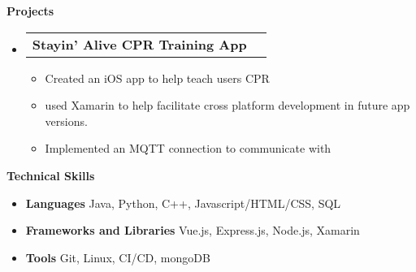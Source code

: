 \documentclass[letterpaper,12pt]{article}[leftmargin=*]
\makeatletter
\def \entryspacing {-0pt}
\renewcommand{\section}[2]{\vspace{5pt}
  \colorbox{secondary}{\color{white}\raggedbottom\normalsize\textbf{{#1}{\hspace{7pt}#2}}}
}
\newcommand{\resumeEntryStart}{\begin{itemize}[leftmargin=2.5mm]}
\newcommand{\resumeEntryEnd}{\end{itemize}\vspace{\entryspacing}}
\newcommand{\resumeItemListStart}{\begin{itemize}[leftmargin=4.5mm]}
\newcommand{\resumeItemListEnd}{\end{itemize}}
\newcommand{\resumeItem}[1]{
  \item\small{
    {#1 \vspace{-2pt}}
  }
}
\newcommand{\resumeEntryTD}[2]{
  \vspace{-1pt}\item[]
    \begin{tabularx}{0.97\textwidth}{X@{\hspace{60pt}}r}
      \textbf{\color{primary}#1} & {\firabook\color{accent}\small#2} \\
    \end{tabularx}\vspace{-6pt}
}
\newcommand{\resumeEntryS}[2]{
  \item[]\small{
    \textbf{\color{primary}#1 }{ #2 \vspace{-6pt}}
  }
}
\makeatother
\begin{document}
\section{\faFlask}{Projects}

  \resumeEntryStart
    \resumeEntryTD
      {Stayin' Alive CPR Training App}{}
    \resumeItemListStart
      \resumeItem {Created an iOS app to help teach users CPR}
      \resumeItem {used Xamarin to help facilitate cross platform development in future app versions.}
      \resumeItem {Implemented an MQTT connection to communicate with }
    \resumeItemListEnd
  \resumeEntryEnd


\section{\faGears}{Technical Skills}
 \resumeEntryStart
  \resumeEntryS{Languages } {Java, Python, C++, Javascript/HTML/CSS, SQL}
  \resumeEntryS{Frameworks and Libraries } {Vue.js, Express.js, Node.js, Xamarin}
  \resumeEntryS{Tools }{ Git, Linux, CI/CD, mongoDB}
 \resumeEntryEnd
\end{document}
